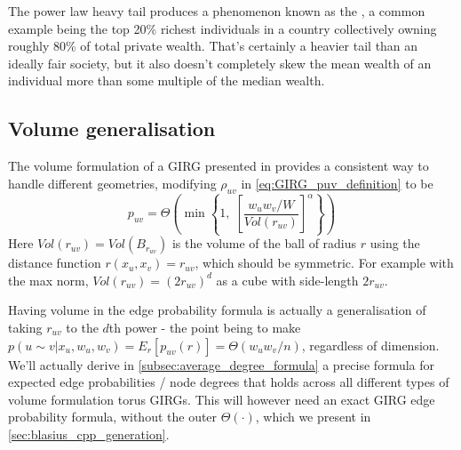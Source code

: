 The power law heavy tail produces a phenomenon known as the , a common example being the top 20\% richest individuals in a country collectively owning roughly 80\% of total private wealth. That's certainly a heavier tail than an ideally fair society, but it also doesn't completely skew the mean wealth of an individual more than some multiple of the median wealth.


\subsection{Volume generalisation}
The volume formulation of a GIRG presented in \cite{bringmann2019geometric} provides a consistent way to handle different geometries, modifying $\rho_{uv}$ in \cref{eq:GIRG_puv_definition} to be 
\begin{equation}
    p_{uv} = \Theta \left ( \min \left \{
        1,\;
        \left [
            \frac{w_u w_v / W}{Vol(r_{uv})}
        \right ]^\alpha
    \right \}
    \right )
    \label{eq:GIRG_puv_definition_volume_formulation}
\end{equation}
Here $Vol(r_{uv}) = Vol(B_{r_{uv}})$ is the volume of the ball of radius $r$ using the distance function $r(x_u, x_v) = r_{uv}$, which should be symmetric.
For example with the max norm, $Vol(r_{uv}) = (2r_{uv})^d$ as a cube with side-length $2r_{uv}$.

Having volume in the edge probability formula is actually a generalisation of taking $r_{uv}$ to the $d$th power - the point being to make $p(u \sim v | x_u, w_u, w_v) = E_r[p_{uv}(r)] = \Theta(w_u w_v/n)$, regardless of dimension. We'll actually derive in \cref{subsec:average_degree_formula} a precise formula for expected edge probabilities / node degrees that holds across all different types of volume formulation torus GIRGs. This will however need an exact GIRG edge probability formula, without the outer $\Theta ( \cdot )$, which we present in \cref{sec:blasius_cpp_generation}.


